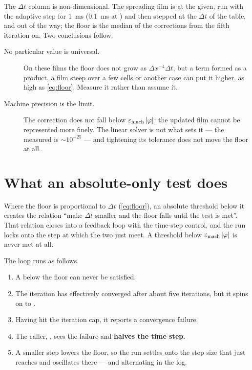 The $\Delta t$ column is non-dimensional. The spreading film is
 at the  given, run with the adaptive step for
\SI{1}{\milli\second} (\SI{0.1}{\milli\second} at ) and then
stepped at the $\Delta t$ of the table,  and 
out of the way; the floor is the median of the corrections from the fifth
iteration on. Two conclusions follow.

\begin{description}
  \item[No particular value is universal.] On these films the floor does not
    grow as $\Delta x^{-4}\Delta t$, but a term formed as a product, a film
    steep over a few cells or another case can put it higher, as high as
    \cref{eq:floor}. Measure it rather than assume it.
  \item[Machine precision is the limit.] The correction does not fall below
    $\varepsilon_{\mathrm{mach}}\,\lvert\varphi\rvert$: the updated film cannot be represented
    more finely. The linear solver is not what sets it --- the measured
     is $\sim 10^{-25}$ --- and tightening its tolerance does
    not move the floor at all.
\end{description}

\section{What an absolute-only test does}
\label{sec:convergence:absolute}

\begin{warn}
  Where the floor is proportional to $\Delta t$ (\cref{eq:floor}), an
  absolute threshold below it creates the relation ``make $\Delta t$ smaller
  and the floor falls until the test is met''. That relation closes into a
  feedback loop with the time-step control, and the run locks onto the step
  at which the two just meet. A threshold below $\varepsilon_{\mathrm{mach}}\,\lvert\varphi\rvert$
  is never met at all.
\end{warn}

The loop runs as follows.

\begin{enumerate}
  \item A  below the floor can never be satisfied.
  \item The iteration has effectively converged after about five iterations,
    but it spins on to .
  \item Having hit the iteration cap, it reports a convergence failure.
  \item The caller, , sees the failure and \textbf{halves the
    time step}.
  \item A smaller step lowers the floor, so the run settles onto the step size
    that just reaches  and oscillates there ---  and
     alternating in the log.
\end{enumerate}

